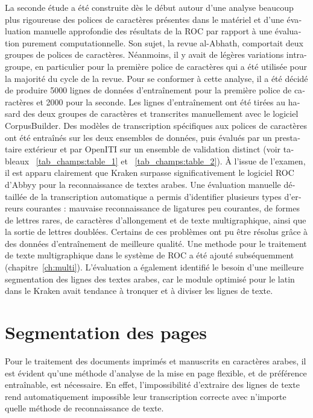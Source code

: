 \begin{french}
La seconde étude a été construite dès le début autour d'une analyse beaucoup
plus rigoureuse des polices de caractères présentes dans le matériel et d'une
évaluation manuelle approfondie des résultats de la ROC par rapport à une
évaluation purement computationnelle. Son sujet, la revue al-Abhath, comportait deux groupes 
de polices de caractères. Néanmoins, il y avait
de légères variations intra-groupe, en particulier pour la première police de
caractères qui a été utilisée pour la majorité du cycle de la revue. Pour se
conformer à cette analyse, il a été décidé de produire 5000 lignes de données
d'entraînement pour la première police de caractères et 2000 pour la seconde.
Les lignes d'entraînement ont été tirées au hasard des deux groupes de
caractères et transcrites manuellement avec le logiciel CorpusBuilder. Des
modèles de transcription spécifiques aux polices de caractères ont été
entraînés sur les deux ensembles de données, puis évalués par un prestataire
extérieur et par OpenITI sur un ensemble de validation distinct (voir tableaux
~\ref{tab_champs:table_1} et ~\ref{tab_champs:table_2}). À l'issue de l'examen,
il est apparu clairement que Kraken surpasse significativement le logiciel ROC
d'Abbyy pour la reconnaissance de textes arabes. Une évaluation manuelle
détaillée de la transcription automatique a permis d'identifier plusieurs types
d'erreurs courantes : mauvaise reconnaissance de ligatures peu courantes, de
formes de lettres rares, de caractères d'allongement et de texte multigraphique, ainsi que 
la sortie de lettres doublées. Certains de ces problèmes ont pu être résolus
grâce à des données d'entraînement de meilleure qualité. Une methode pour le
traitement de texte multigraphique dans le système de ROC a été ajouté
subséquemment (chapitre~\ref{ch:multi}). L'évaluation a également identifié le
besoin d'une meilleure segmentation des lignes des textes arabes, car le module
optimisé pour le latin dans le Kraken avait tendance à tronquer et à diviser
les lignes de texte.

\section{Segmentation des pages}

Pour le traitement des documents imprimés et manuscrits en caractères arab\-es,
il est évident qu'une méthode d'analyse de la mise en page flexible, et de
préférence entraînable, est nécessaire. En effet, l'impossibilité d'extraire des
lignes de texte rend automatiquement impossible leur transcription correcte
avec n'importe quelle méthode de reconnaissance de texte.


\end{french}
